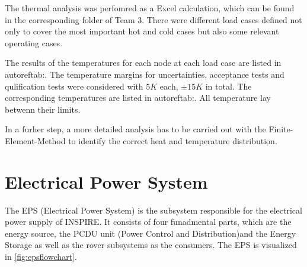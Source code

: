 The thermal analysis was perfomred as a Excel calculation, which can be found in the corresponding folder of Team 3.
There were different load cases defined not only to cover the most important hot and cold cases but also some relevant operating cases.






The results of the temperatures for each node at each load case are listed in autoref{tab:}.
The temperature margins for uncertainties, acceptance tests and qulification tests were considered with $5 K$ each, $\pm 15K$ in total.
The corresponding temperatures are listed in autoref{tab:}.
All temperature lay betwenn their limits.


In a furher step, a more detailed analysis has to be carried out with the Finite-Element-Method to identify the correct heat and temperature distribution.\\

\clearpage

\section{Electrical Power System}
\label{sec:EPS}
The EPS (Electrical Power System) is the subsystem responsible for the electrical power supply of INSPIRE. It consists of four funadmental parts, which are the energy source, the PCDU unit (Power Control and Distribution)and the Energy Storage as well as the rover subsystems as the consumers. The EPS is visualized in \autoref{fig:epsflowchart}.

